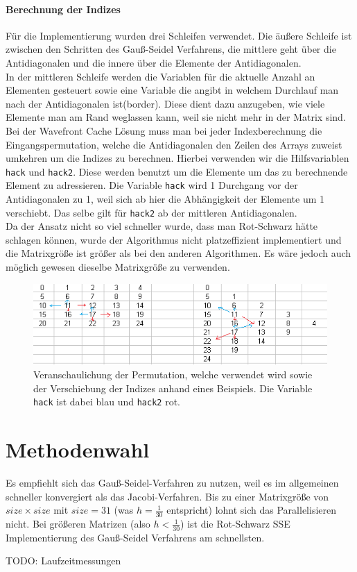 \documentclass{article}
\begin{document}
\paragraph{Berechnung der Indizes}
Für die Implementierung wurden drei Schleifen verwendet. Die äußere Schleife ist zwischen den Schritten des Gauß-Seidel Verfahrens, die mittlere geht über die Antidiagonalen und die innere über die Elemente der Antidiagonalen. \\
In der mittleren Schleife werden die Variablen für die aktuelle Anzahl an Elementen gesteuert sowie eine Variable die angibt in welchem Durchlauf man nach der Antidiagonalen ist(border). Diese dient dazu anzugeben, wie viele Elemente man am Rand weglassen kann, weil sie nicht mehr in der Matrix sind.\\
Bei der Wavefront Cache Lösung muss man bei jeder Indexberechnung die Eingangspermutation, welche die Antidiagonalen den Zeilen des Arrays zuweist umkehren um die Indizes zu berechnen. Hierbei verwenden wir die Hilfsvariablen \texttt{hack} und \texttt{hack2}. Diese werden benutzt um die Elemente um das zu berechnende Element zu adressieren. Die Variable \texttt{hack} wird 1 Durchgang vor der Antidiagonalen zu 1, weil sich ab hier die Abhängigkeit der Elemente um 1 verschiebt. Das selbe gilt für \texttt{hack2} ab der mittleren Antidiagonalen. \\
Da der Ansatz nicht so viel schneller wurde, dass man Rot-Schwarz hätte schlagen können, wurde der Algorithmus nicht platzeffizient implementiert und die Matrixgröße ist größer als bei den anderen Algorithmen. Es wäre jedoch auch möglich gewesen dieselbe Matrixgröße zu verwenden.

\begin{figure}[h] 
  \centering
     \includegraphics[width=1\textwidth]{bilder/hack.png}
  \caption{Veranschaulichung der Permutation, welche verwendet wird sowie der Verschiebung der Indizes anhand eines Beispiels. Die Variable \texttt{hack} ist dabei blau und \texttt{hack2} rot.}
  \label{fig:Bild6}
\end{figure}

\section{Methodenwahl}
Es empfiehlt sich das Gauß-Seidel-Verfahren zu nutzen, weil es im allgemeinen schneller konvergiert als das Jacobi-Verfahren. Bis zu einer Matrixgröße von $size \times size$ mit $size = 31$ (was $h=\frac{1}{30}$ entspricht) lohnt sich das Parallelisieren nicht. Bei größeren Matrizen (also $h < \frac{1}{30}$) ist die Rot-Schwarz SSE Implementierung des Gauß-Seidel Verfahrens am schnellsten.

TODO: Laufzeitmessungen
\end{document}
